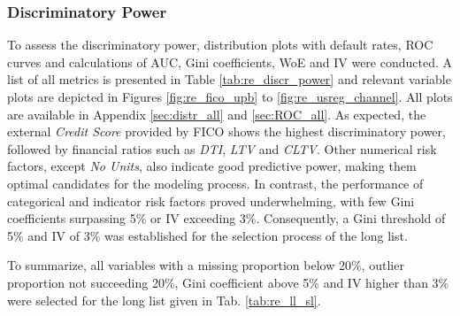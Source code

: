 \subsubsection{Discriminatory Power}
To assess the discriminatory power, distribution plots with default rates, ROC curves and calculations of AUC, Gini coefficients, WoE and IV were conducted. A list of all metrics is presented in Table \ref{tab:re_discr_power} and relevant variable plots are depicted in Figures \ref{fig:re_fico_upb} to \ref{fig:re_usreg_channel}. All plots are available in Appendix \ref{sec:distr_all} and \ref{sec:ROC_all}. As expected, the external \emph{Credit Score} provided by FICO shows the highest discriminatory power, followed by financial ratios such as \emph{DTI}, \emph{LTV} and \emph{CLTV}. Other numerical risk factors, except \emph{No Units}, also indicate good predictive power, making them optimal candidates for the modeling process. In contrast,  the performance of categorical and indicator risk factors proved underwhelming, with few Gini coefficients surpassing 5\% or IV exceeding 3\%. Consequently, a Gini threshold of 5\% and IV of 3\% was established for the selection process of the long list.

To summarize, all variables with a missing proportion below 20\%, outlier proportion not succeeding 20\%, Gini coefficient above 5\% and IV higher than 3\% were selected for the long list given in Tab. \ref{tab:re_ll_sl}. 

